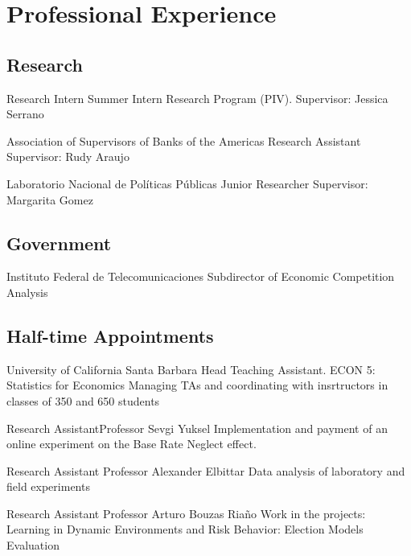 \section{Professional Experience}

\subsection{Research}

{Research Intern}
{}{}
{Summer Intern Research Program (PIV). Supervisor: Jessica Serrano}

{Association of Supervisors of Banks of the Americas}
{Research Assistant}
{}{}
{Supervisor: Rudy Araujo}

{Laboratorio Nacional de Políticas Públicas}
{Junior Researcher}
{}{}
{Supervisor: Margarita Gomez}

\subsection{Government}

{Instituto Federal de Telecomunicaciones}
{Subdirector of Economic Competition Analysis}
{}{}{}

\subsection{Half-time Appointments}

{University of California Santa Barbara}
{Head Teaching Assistant. ECON 5: Statistics for Economics}
{}{}{Managing TAs and coordinating with insrtructors in classes of 350 and 650 students}

{Research Assistant}{Professor Sevgi Yuksel}
{}
{Implementation and payment of an online experiment on the Base Rate Neglect effect.}

{Research Assistant}
{Professor Alexander Elbittar}
{}
{Data analysis of  laboratory and field experiments}

{Research Assistant}
{Professor Arturo Bouzas Riaño}
{}
{Work in the projects: Learning in Dynamic Environments and Risk Behavior: Election Models Evaluation}{}{}{}

%

